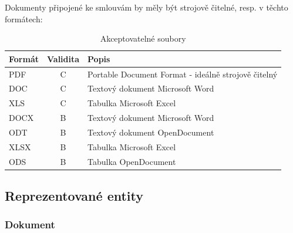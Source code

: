 Dokumenty připojené ke smlouvám by měly být strojově čitelné, resp. v těchto formátech:

\begin{table}[h]
\centering
\begin{tabular}{lcl}
\textbf{Formát} & \textbf{Validita} & \textbf{Popis} \\
\hline
\rowcolor{validateC}PDF & C & Portable Document Format - ideálně strojově čitelný \\
\rowcolor{validateC}DOC & C & Textový dokument Microsoft Word \\
\rowcolor{validateC}XLS & C & Tabulka Microsoft Excel \\
\rowcolor{validateB}DOCX & B & Textový dokument Microsoft Word \\
\rowcolor{validateB}ODT & B & Textový dokument OpenDocument \\
\rowcolor{validateB}XLSX & B & Tabulka Microsoft Excel \\
\rowcolor{validateB}ODS & B & Tabulka OpenDocument \\
\end{tabular}
\caption{Akceptovatelné soubory}
\end{table}

\newpage

\subsection{Reprezentované entity}

\medskip

\subsubsection*{Dokument}

